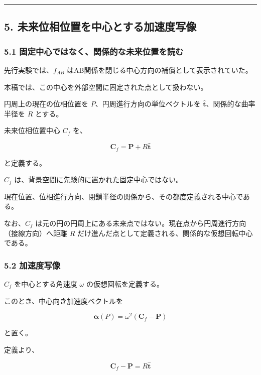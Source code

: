 \documentclass[
  a4paper,
]{ltjsarticle}
\begin{document}
\begin{center}\rule{0.5\linewidth}{0.5pt}\end{center}

\subsection{5.
未来位相位置を中心とする加速度写像}\label{ux672aux6765ux4f4dux76f8ux4f4dux7f6eux3092ux4e2dux5fc3ux3068ux3059ux308bux52a0ux901fux5ea6ux5199ux50cf}

\subsubsection{5.1
固定中心ではなく、関係的な未来位置を読む}\label{ux56faux5b9aux4e2dux5fc3ux3067ux306fux306aux304fux95a2ux4fc2ux7684ux306aux672aux6765ux4f4dux7f6eux3092ux8aadux3080}

先行実験では、\(f_{AB}\)
はAB関係を閉じる中心方向の補償として表示されていた。

本稿では、この中心を外部空間に固定された点として扱わない。

円周上の現在の位相位置を \(P\)、円周進行方向の単位ベクトルを
\(\hat{\boldsymbol t}\)、関係的な曲率半径を \(R\) とする。

未来位相位置中心 \(C_f\) を、

\[
\boldsymbol C_f
=\boldsymbol P+R\hat{\boldsymbol t}
\]

と定義する。

\(C_f\) は、背景空間に先験的に置かれた固定中心ではない。

現在位置、位相進行方向、閉鎖半径の関係から、その都度定義される中心である。

なお、\(C_f\)
は元の円の円周上にある未来点ではない。現在点から円周進行方向（接線方向）へ距離
\(R\) だけ進んだ点として定義される、関係的な仮想回転中心である。

\subsubsection{5.2 加速度写像}\label{ux52a0ux901fux5ea6ux5199ux50cf}

\(C_f\) を中心とする角速度 \(\omega\) の仮想回転を定義する。

このとき、中心向き加速度ベクトルを

\[
\boldsymbol\alpha(P)
=\omega^2(\boldsymbol C_f-\boldsymbol P)
\]

と置く。

定義より、

\[
\boldsymbol C_f-\boldsymbol P
=R\hat{\boldsymbol t}
\]
\end{document}
